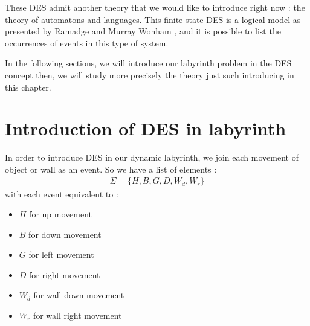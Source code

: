 These DES admit another theory that we would like to introduce right now : the theory of automatons and languages. This finite state DES is a logical model as presented by Ramadge and Murray Wonham \cite{controlOfDiscreteEvent_Ramadge}, and it is possible to list the occurrences of events in this type of system. 
	

In the following sections, we will introduce our labyrinth problem in the DES concept then, we will study more precisely the theory just such introducing in this chapter.


\section{Introduction of DES in labyrinth}

In order to introduce DES in our dynamic labyrinth, we join each movement of object or wall as an event. So we have a list of elements : 
\begin{align*}
\Sigma = \lbrace H, B, G, D, W_d, W_r \rbrace
\end{align*}
with each event equivalent to :
\newline 
\begin{minipage}{.5\textwidth}
\begin{itemize}
\item $H$ for up movement
\item $B$ for down movement
\item $G$ for left movement
\item $D$ for right movement
\end{itemize}
\end{minipage}
\begin{minipage}{.5\textwidth}
\begin{itemize}
\item $W_d$ for wall down movement
\item $W_r$ for wall right movement
\end{itemize}
\end{minipage}
\newline

